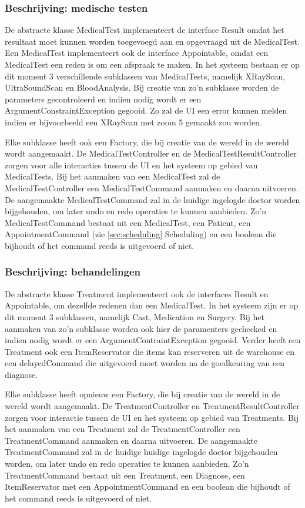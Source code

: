 \documentclass[a4paper]{article}
\begin{document}
\subsubsection{Beschrijving: medische testen}
De abstracte klasse MedicalTest implementeert de interface Result omdat het resultaat moet kunnen worden toegevoegd aan en opgevraagd uit de MedicalTest. Een MedicalTest implementeert ook de interface Appointable, omdat een MedicalTest een reden is om een afspraak te maken. In het systeem bestaan er op dit moment 3 verschillende subklassen van MedicalTests, namelijk XRayScan, UltraSoundScan en BloodAnalysis. Bij creatie van zo'n subklasse worden de parameters gecontroleerd en indien nodig wordt er een ArgumentConstraintException gegooid. Zo zal de UI een error kunnen melden indien er bijvoorbeeld een XRayScan met zoom 5 gemaakt zou worden. 

Elke subklasse heeft ook een Factory, die bij creatie van de wereld in de wereld wordt aangemaakt. De MedicalTestController en de MedicalTestResultController zorgen voor alle interacties tussen de UI en het systeem op gebied van MedicalTests. Bij het aanmaken van een MedicalTest zal de MedicalTestController een MedicalTestCommand aanmaken en daarna uitvoeren. De aangemaakte MedicalTestCommand zal in de huidige ingelogde doctor worden bijgehouden, om later undo en redo operaties te kunnen aanbieden. Zo'n MedicalTestCommand bestaat uit een MedicalTest, een Patient, een AppointmentCommand (zie \ref{sec:scheduling} Scheduling) en een boolean die bijhoudt of het command reeds is uitgevoerd of niet.

\subsubsection{Beschrijving: behandelingen}
De abstracte klasse Treatment implementeert ook de interfaces Result en Appointable, om dezelfde redenen dan een MedicalTest. In het systeem zijn er op dit moment 3 subklassen, namelijk Cast, Medication en Surgery. Bij het aanmaken van zo'n subklasse worden ook hier de paramenters gechecked en indien nodig wordt er een ArgumentContraintException gegooid. Verder heeft een Treatment ook een ItemReservator die items kan reserveren uit de warehouse en een delayedCommand die uitgevoerd moet worden na de goedkeuring van een diagnose.

Elke subklasse heeft opnieuw een Factory, die bij creatie van de wereld in de wereld wordt aangemaakt. De TreatmentController en TreatmentResultController zorgen voor interactie tussen de UI en het systeem op gebied van Treatments. Bij het aanmaken van een Treatment zal de TreatmentController een TreatmentCommand aanmaken en daarna uitvoeren. De aangemaakte TreatmentCommand zal in de huidige huidige ingelogde doctor bijgehouden worden, om later undo en redo operaties te kunnen aanbieden. Zo'n TreatmentCommand bestaat uit een Treatment, een Diagnose, een ItemReservator met een AppointmentCommand en een boolean die bijhoudt of het command reeds is uitgevoerd of niet.
\end{document}
